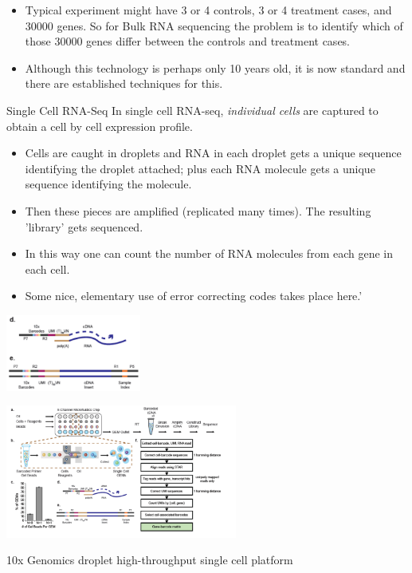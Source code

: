 \documentclass{beamer}
\begin{document}
\begin{frame}
  \begin{itemize}
        \item
  Typical experiment might have 3 or 4 controls, 3 or 4 treatment cases, and 30000 genes.  So for Bulk RNA sequencing the problem is to identify which of those 30000 genes differ between the controls and treatment cases.  
\item Although this technology is perhaps only 10 years old, it is now standard and there are established techniques for this.
\end{itemize}
\end{frame}
\begin{frame}{Single Cell RNA-Seq}
  In single cell RNA-seq, \textit{individual cells} are captured to obtain a cell by cell expression profile.
  \begin{itemize}
  \item Cells are caught in droplets and RNA in each droplet gets a unique sequence identifying the droplet attached; plus each RNA molecule gets a unique sequence identifying the molecule.
  \item Then these pieces are amplified (replicated many times).  The resulting 'library' gets sequenced.
  \item In this way one can count the number of RNA molecules from each gene in each cell.
  \item Some nice, elementary use of error correcting codes takes place here.'
  \end{itemize}
\begin{center}
  \includegraphics[width=1.75in]{10XSingleCellDetail.png}
\end{center}
\end{frame}
\begin{frame}
\begin{center}
  \includegraphics[width=3in]{10xSingleCellOverview.png}

  10x Genomics droplet high-throughput single cell platform
\end{center}
\end{frame}
\end{document}
